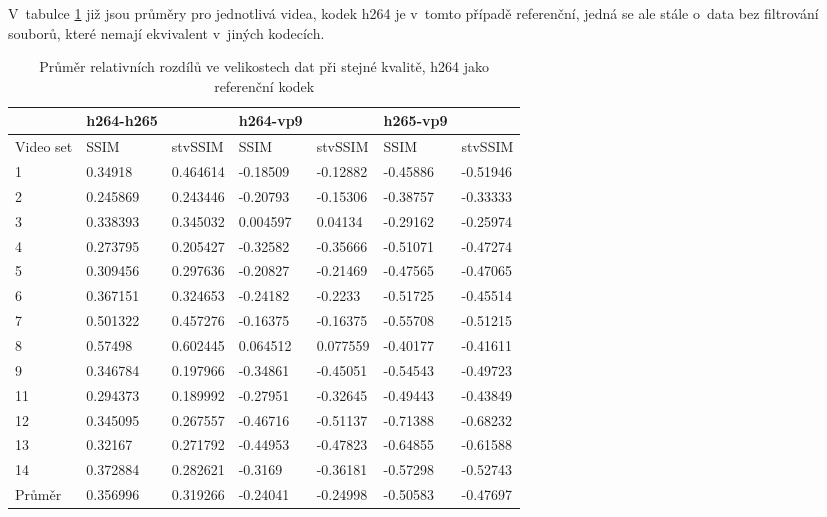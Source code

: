 \documentclass[thesis=M,czech]{FITthesis}[2016/06/26]
\begin{document}
V~tabulce \ref{data_avg_diff_h264} již jsou průměry pro jednotlivá videa, kodek h264 je v~tomto případě referenční, jedná se ale stále o~data bez filtrování souborů, které nemají ekvivalent v~jiných kodecích.
\begin{table}[]
\centering
\begin{tabular}{|l|l|l|l|l|l|l|}
\hline
          & h264-h265 &          & h264-vp9 &          & h265-vp9 &          \\ \hline
Video set & SSIM      & stvSSIM  & SSIM     & stvSSIM  & SSIM     & stvSSIM  \\ \hline
1         & 0.34918   & 0.464614 & -0.18509 & -0.12882 & -0.45886 & -0.51946 \\ \hline
2         & 0.245869  & 0.243446 & -0.20793 & -0.15306 & -0.38757 & -0.33333 \\ \hline
3         & 0.338393  & 0.345032 & 0.004597 & 0.04134  & -0.29162 & -0.25974 \\ \hline
4         & 0.273795  & 0.205427 & -0.32582 & -0.35666 & -0.51071 & -0.47274 \\ \hline
5         & 0.309456  & 0.297636 & -0.20827 & -0.21469 & -0.47565 & -0.47065 \\ \hline
6         & 0.367151  & 0.324653 & -0.24182 & -0.2233  & -0.51725 & -0.45514 \\ \hline
7         & 0.501322  & 0.457276 & -0.16375 & -0.16375 & -0.55708 & -0.51215 \\ \hline
8         & 0.57498   & 0.602445 & 0.064512 & 0.077559 & -0.40177 & -0.41611 \\ \hline
9         & 0.346784  & 0.197966 & -0.34861 & -0.45051 & -0.54543 & -0.49723 \\ \hline
11        & 0.294373  & 0.189992 & -0.27951 & -0.32645 & -0.49443 & -0.43849 \\ \hline
12        & 0.345095  & 0.267557 & -0.46716 & -0.51137 & -0.71388 & -0.68232 \\ \hline
13        & 0.32167   & 0.271792 & -0.44953 & -0.47823 & -0.64855 & -0.61588 \\ \hline
14        & 0.372884  & 0.282621 & -0.3169  & -0.36181 & -0.57298 & -0.52743 \\ \hline \hline
Průměr    & 0.356996  & 0.319266 & -0.24041 & -0.24998 & -0.50583 & -0.47697 \\ \hline
\end{tabular}
\caption{Průměr relativních rozdílů ve velikostech dat při stejné kvalitě, h264 jako referenční kodek}
\label{data_avg_diff_h264}
\end{table}
\end{document}
